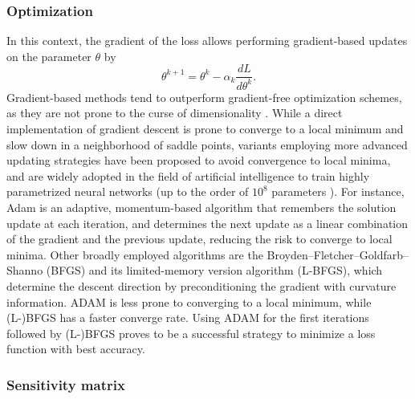 \subsubsection{Optimization}

In this context, the gradient of the loss allows performing gradient-based updates on the parameter $\theta$ by 
\begin{equation}
    \theta^{k+1} 
    = 
    \theta^k 
    - 
    \alpha_k 
    \frac{dL}{d\theta^k}.
\end{equation}
Gradient-based methods tend to outperform gradient-free optimization schemes, as they are not prone to the curse of dimensionality \cite{Schartau2017}. 
While a direct implementation of gradient descent is prone to converge to a local minimum and slow down in a neighborhood of saddle points, variants employing more advanced updating strategies have been proposed \cite{ruder2016overview-gradient-descent} to avoid convergence to local minima, and are widely adopted in the field of artificial intelligence to train highly parametrized neural networks (up to the order of $10^8$ parameters \cite{NIPS2017_3f5ee243}). 
For instance, Adam \cite{Kingma2014} is an adaptive, momentum-based algorithm  that remembers the solution update at each iteration, and determines the next update as a linear combination of the gradient and the previous update, reducing the risk to converge to local minima. 
Other broadly employed algorithms are the Broyden–Fletcher–Goldfarb–Shanno (BFGS) and its limited-memory version algorithm (L-BFGS), which determine the descent direction by preconditioning the gradient with curvature information. 
ADAM is less prone to converging to a local minimum, while (L-)BFGS has a faster converge rate. 
Using ADAM for the first iterations followed by (L-)BFGS proves to be a successful strategy to minimize a loss function with best accuracy. 

\subsubsection{Sensitivity matrix}

